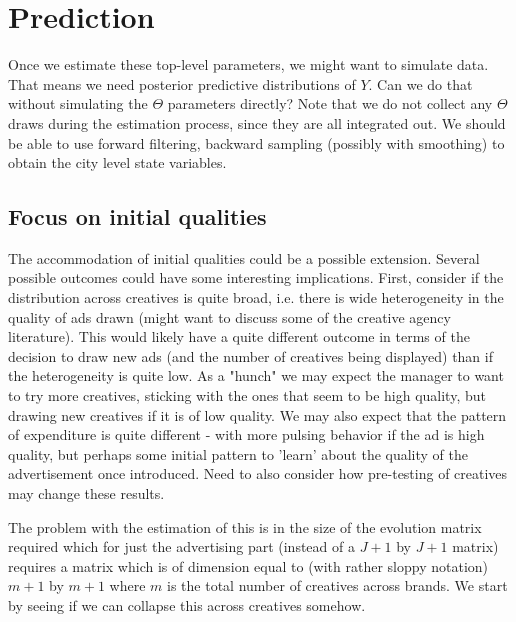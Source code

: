 \documentclass[letter,10pt]{article}
\begin{document}
\section*{Prediction}

Once we estimate these top-level parameters, we might want to simulate
data.  That means we need posterior predictive distributions of $Y$.
Can we do that without simulating the $\Theta$ parameters directly?
Note that we do not collect any $\Theta$ draws during the estimation
process, since they are all integrated out.  We should be able to use
forward filtering, backward sampling (possibly with smoothing) to obtain
the city level state variables.  


\subsection{Focus on initial qualities}
The accommodation of initial qualities could be a possible extension.   
Several possible outcomes could have some interesting implications.  First, 
consider if the distribution across creatives is quite broad, i.e. there is wide heterogeneity
in the quality of ads drawn (might want to discuss some of the creative agency literature). 
This would likely have a quite different outcome in terms of the decision to draw
new ads (and the number of creatives being displayed) than if the heterogeneity is
quite low.  As a "hunch" we may expect the manager to want to try more creatives, sticking
with the ones that seem to be high quality, but drawing new creatives if it is of low quality.
We may also expect that the pattern of expenditure is quite different - with more
pulsing behavior if the ad is high quality, but perhaps some initial pattern to 
'learn' about the quality of the advertisement once introduced.  Need to also consider
how pre-testing of creatives may change these results.  

The problem with the estimation of this is in the size of the evolution matrix required
which for just the advertising part (instead of a $J+1$ by $J+1$ matrix) requires a 
matrix which is of dimension equal to (with rather sloppy notation) $m+1$ by $m+1$ where $m$ is the total number of creatives across brands.   We start by seeing if we can 
collapse this across creatives somehow.  
\end{document}
